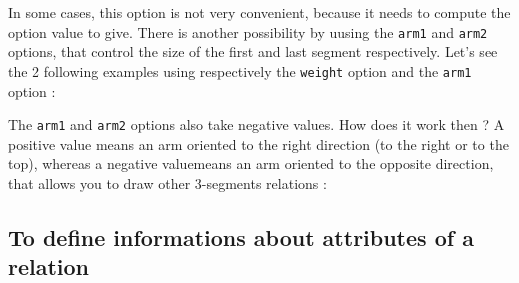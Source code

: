 \documentclass[a4paper,11pt]{report}
\newcommand{\inputTikZ}[1]{%
  }%
\newcommand{\inputTikZ}[1]{%
    \texttt{[image: fig/\#1.pdf]}%
  }%
\begin{document}
In some cases, this option is not very convenient, because it needs to compute the option value to give.
There is another possibility by uusing the  \hypertarget{arm1}{{\tt arm1}} and  \hypertarget{arm2}{{\tt arm2}} options, that control the size 
of the first and last segment respectively. Let's see the 2 following examples using respectively the {\tt weight} option and the {\tt arm1} option :

\medskip

\begin{minipage}{0.5\textwidth}

\end{minipage}
\begin{minipage}{0.4\textwidth}
\begin{center}
\inputTikZ{relationweight2}
\end{center}
\end{minipage}

\medskip

\begin{minipage}{0.5\textwidth}

\end{minipage}
\begin{minipage}{0.4\textwidth}
\begin{center}
\inputTikZ{relationarm}
\end{center}
\end{minipage}

\medskip

The {\tt arm1} and {\tt arm2} options also take negative values. How does it work then ? 
A positive value means an arm oriented to the right direction (to the right or to the top), whereas a negative valuemeans an arm oriented to the opposite direction, that allows you to draw other 3-segments relations :

\medskip

\begin{minipage}{0.5\textwidth}

\end{minipage}
\begin{minipage}{0.4\textwidth}
\begin{center}
\inputTikZ{relationarm2}
\end{center}
\end{minipage}


\subsection{To define informations about attributes of a relation}\label{ss.relattr}
\end{document}

